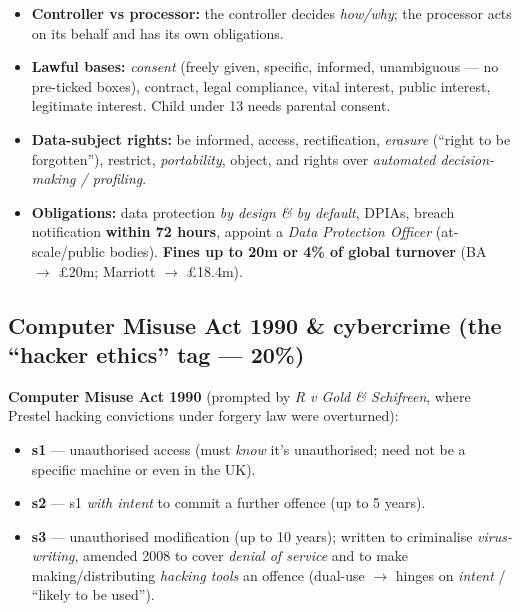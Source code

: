 \documentclass[11pt,a4paper]{article}
\begin{document}
\begin{useful}
\begin{itemize}[leftmargin=*,itemsep=1pt]
  \item \textbf{Controller vs processor:} the controller decides \emph{how/why}; the processor acts on its behalf and has its own obligations.
  \item \textbf{Lawful bases:} \emph{consent} (freely given, specific, informed, unambiguous --- no pre-ticked boxes), contract, legal compliance, vital interest, public interest, legitimate interest. Child under 13 needs parental consent.
  \item \textbf{Data-subject rights:} be informed, access, rectification, \emph{erasure} (``right to be forgotten''), restrict, \emph{portability}, object, and rights over \emph{automated decision-making / profiling}.
  \item \textbf{Obligations:} data protection \emph{by design \& by default}, DPIAs, breach notification \textbf{within 72 hours}, appoint a \emph{Data Protection Officer} (at-scale/public bodies). \textbf{Fines up to \texteuro20m or 4\% of global turnover} (BA $\to$ \pounds20m; Marriott $\to$ \pounds18.4m).
\end{itemize}
\end{useful}

\subsection{Computer Misuse Act 1990 \& cybercrime (the ``hacker ethics'' tag --- 20\%)}

\begin{must}
\textbf{Computer Misuse Act 1990} (prompted by \emph{R v Gold \& Schifreen}, where Prestel hacking convictions under forgery law were overturned):
\begin{itemize}[leftmargin=*,itemsep=1pt]
  \item \textbf{s1} --- unauthorised access (must \emph{know} it's unauthorised; need not be a specific machine or even in the UK).
  \item \textbf{s2} --- s1 \emph{with intent} to commit a further offence (up to 5 years).
  \item \textbf{s3} --- unauthorised modification (up to 10 years); written to criminalise \emph{virus-writing}, amended 2008 to cover \emph{denial of service} and to make making/distributing \emph{hacking tools} an offence (dual-use $\to$ hinges on \emph{intent} / ``likely to be used'').
\end{itemize}
\end{must}
\end{document}
